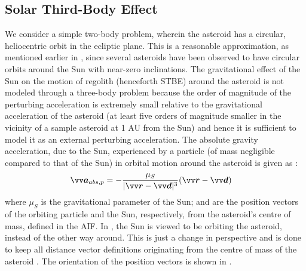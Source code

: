 \subsection{Solar Third-Body Effect}
\label{subsec:stbe}
We consider a simple two-body problem, wherein the asteroid has a circular, heliocentric orbit in the ecliptic plane. This is a reasonable approximation, as mentioned earlier in , since several asteroids have been observed to have circular orbits around the Sun with near-zero inclinations. The gravitational effect of the Sun on the motion of regolith (henceforth \gls{STBE}) around the asteroid is not modeled through a three-body problem because the order of magnitude of the perturbing acceleration is extremely small relative to the gravitational acceleration of the asteroid (at least five orders of magnitude smaller in the vicinity of a sample asteroid at 1 AU from the Sun) and hence it is sufficient to model it as an external perturbing acceleration.
%
\newline\newline
%
The absolute gravity acceleration, due to the Sun, experienced by a particle (of mass negligible compared to that of the Sun) in orbital motion around the asteroid is given as \parencite{scheeresBook}:
\begin{align}
    \bv{a}_{abs, p} &= -\frac{\mu_S}{|\bv{r} - \bv{d}|^3} (\bv{r} - \bv{d})
    \label{eqn:stbe_particle_abs_acc}
\end{align}
where $\mu_S$ is the gravitational parameter of the Sun;  and  are the position vectors of the orbiting particle and the Sun, respectively, from the asteroid's centre of mass, defined in the \gls{AIF}. In , the Sun is viewed to be orbiting the asteroid, instead of the other way around. This is just a change in perspective and is done to keep all distance vector definitions originating from the centre of mass of the asteroid \parencite{scheeresBook}. The orientation of the position vectors is shown in .
